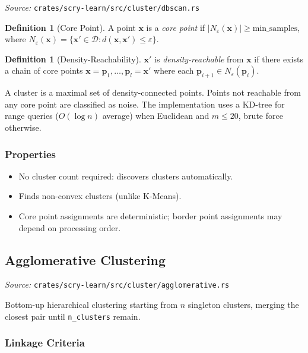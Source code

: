 \documentclass[11pt,a4paper]{article}
\theoremstyle{definition}
\newtheorem{definition}[theorem]{Definition}
\theoremstyle{remark}
\begin{document}
\noindent\textit{Source:} \texttt{crates/scry-learn/src/cluster/dbscan.rs}

\begin{definition}[Core Point]
A point $\mathbf{x}$ is a \emph{core point} if $|N_\varepsilon(\mathbf{x})| \geq \text{min\_samples}$, where $N_\varepsilon(\mathbf{x}) = \{\mathbf{x}' \in \mathcal{D} : d(\mathbf{x}, \mathbf{x}') \leq \varepsilon\}$.
\end{definition}

\begin{definition}[Density-Reachability]
$\mathbf{x}'$ is \emph{density-reachable} from $\mathbf{x}$ if there exists a chain of core points $\mathbf{x} = \mathbf{p}_1, \ldots, \mathbf{p}_l = \mathbf{x}'$ where each $\mathbf{p}_{i+1} \in N_\varepsilon(\mathbf{p}_i)$.
\end{definition}

A cluster is a maximal set of density-connected points. Points not reachable from any core point are classified as noise. The implementation uses a KD-tree for range queries ($O(\log n)$ average) when Euclidean and $m \leq 20$, brute force otherwise.

\subsubsection*{Properties}
\begin{itemize}[itemsep=0pt]
\item No cluster count required: discovers clusters automatically.
\item Finds non-convex clusters (unlike K-Means).
\item Core point assignments are deterministic; border point assignments may depend on processing order.
\end{itemize}

\subsection{Agglomerative Clustering}
\label{sec:agglo}

\noindent\textit{Source:} \texttt{crates/scry-learn/src/cluster/agglomerative.rs}

Bottom-up hierarchical clustering starting from $n$ singleton clusters, merging the closest pair until \texttt{n\_clusters} remain.

\subsubsection*{Linkage Criteria}
\end{document}
